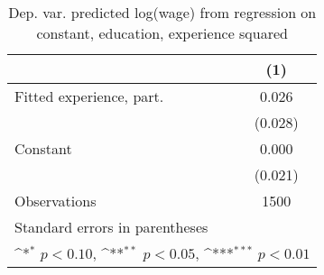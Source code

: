 \begin{table}[htbp]\centering
\def\sym#1{\ifmmode^{#1}\else\(^{#1}\)\fi}
\caption{Dep. var. predicted log(wage) from regression on constant, education, experience squared \label{reg4}}
\begin{tabular}{l*{1}{c}}
\toprule
                    &\multicolumn{1}{c}{(1)}         \\
\midrule
Fitted experience, part.&       0.026         \\
                    &     (0.028)         \\
\addlinespace
Constant            &       0.000         \\
                    &     (0.021)         \\
\midrule
Observations        &        1500         \\
\bottomrule
\multicolumn{2}{l}{\footnotesize Standard errors in parentheses}\\
\multicolumn{2}{l}{\footnotesize \sym{*} \(p<0.10\), \sym{**} \(p<0.05\), \sym{***} \(p<0.01\)}\\
\end{tabular}
\end{table}

